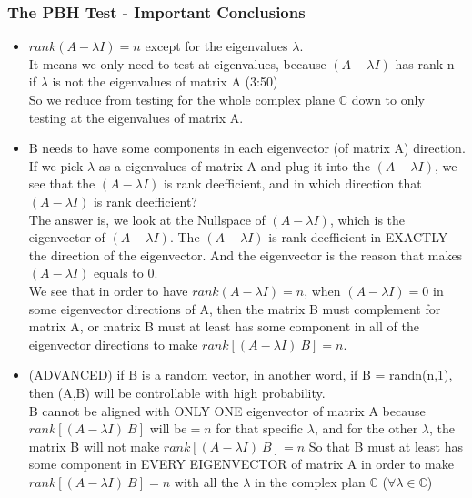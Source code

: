 	\subsubsection{The PBH Test - Important Conclusions}
		\begin{itemize}

		\item $rank(A - \lambda I) = n $ except for the eigenvalues $\lambda$.
				\\It means we only need to test at eigenvalues, 
				because $(A - \lambda I)$ has rank n if $\lambda$ is not the eigenvalues of matrix A (3:50)
				\\ So we reduce from testing for the whole complex plane $\mathbb{C}$ down to only testing
				at the eigenvalues of matrix A.
		\item B needs to have some components in each eigenvector (of matrix A) direction.
				\\If we pick $\lambda$ as a eigenvalues of matrix A and plug it into the $(A - \lambda I)$,
				we see that the $(A - \lambda I)$ is rank deefficient, and in which direction that
				$(A - \lambda I)$ is rank deefficient?
				\\The answer is, we look at the Nullspace of $(A - \lambda I)$, which is the eigenvector 
				of $(A - \lambda I)$. The $(A - \lambda I)$ is rank deefficient in EXACTLY the direction
				of the eigenvector. And the eigenvector is the reason that makes $(A - \lambda I)$ equals to 0.
				\\We see that in order to have $rank(A - \lambda I) = n $, when $(A - \lambda I) = 0$
				in some eigenvector directions of A, then the matrix B must complement for matrix A, or matrix B
				must at least has some component in all of the eigenvector directions to make $rank[(A - \lambda I) ~B] = n$.
		\item (ADVANCED) if B is a random vector, in another word, if B = randn(n,1), then (A,B) will be
				controllable with high probability.\\
				
				B cannot be aligned with ONLY ONE eigenvector of matrix A because $rank[(A - \lambda I) ~B]$ will be$ = n $
				for that specific $\lambda$, and for the other $\lambda$, the matrix B will not make $rank[(A - \lambda I) ~B] = n$
				So that B must at least has some component in EVERY EIGENVECTOR of matrix A in order to make 
				$rank[(A - \lambda I) ~B] = n$ with all the $\lambda$ in the complex plan $\mathbb{C}$ ($\forall \lambda \in \mathbb{C}$)\\
				

\end{itemize}
